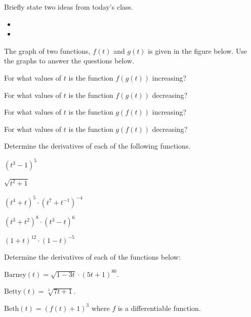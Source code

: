 \postClass

\begin{problem}
\item Briefly state two ideas from today's class.
  \begin{itemize}
  \item
  \item
  \end{itemize}
  \item The graph of two functions, $f(t)$ and $g(t)$ is given in the
    figure below. Use the graphs to answer the questions below.

    \scalebox{0.75}{}

    \begin{subproblem}
    \item For what values of $t$ is the function $f(g(t))$ increasing?
      \vfill
    \item For what values of $t$ is the function $f(g(t))$ decreasing?
      \vfill
    \item For what values of $t$ is the function $g(f(t))$ increasing?
      \vfill
    \item For what values of $t$ is the function $g(f(t))$ decreasing?
      \vfill
    \end{subproblem}

\clearpage

\item Determine the derivatives of each of the following functions.
  \begin{subproblem}
  \item $(t^3-1)^5$
    \vfill
  \item $\sqrt{t^2+1}$
    \vfill
  \item $(t^4+t)^5\cdot (t^7+t^{-1})^{-4}$
    \vfill
  \item $(t^3+t^2)^8\cdot (t^3-t)^6$
    \vfill
  \item $(1+t)^{12}\cdot (1-t)^{-5}$
    \vfill
  \end{subproblem}
\end{problem}





\begin{problem}
\item Determine the derivatives of each of the functions below:
\begin{subproblem}
  \item ${\displaystyle \mathrm{Barney}(t)=\sqrt{1-3t}\cdot\left( 5t+1 \right)^{80}}$.
    \vfill
  \item ${\displaystyle \mathrm{Betty}(t)=\sqrt[3]{7t+1}}$.
    \vfill
  \item ${\displaystyle \mathrm{Beth}(t)=\left(f(t)+1\right)^3}$
    where $f$ is a differentiable function.
    \vfill
\end{subproblem}
\end{problem}


